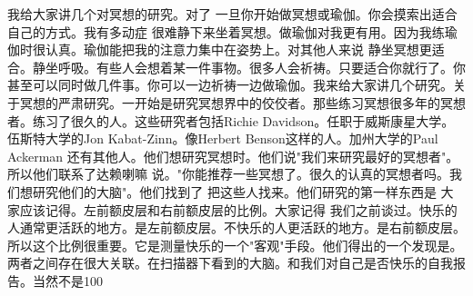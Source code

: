 我给大家讲几个对冥想的研究。对了 一旦你开始做冥想或瑜伽。你会摸索出适合自己的方式。我有多动症 很难静下来坐着冥想。做瑜伽对我更有用。因为我练瑜伽时很认真。瑜伽能把我的注意力集中在姿势上。对其他人来说 静坐冥想更适合。静坐呼吸。有些人会想着某一件事物。很多人会祈祷。只要适合你就行了。你甚至可以同时做几件事。你可以一边祈祷一边做瑜伽。我来给大家讲几个研究。关于冥想的严肃研究。一开始是研究冥想界中的佼佼者。那些练习冥想很多年的冥想者。练习了很久的人。这些研究者包括Richie Davidson。任职于威斯康星大学。伍斯特大学的Jon Kabat-Zinn。像Herbert Benson这样的人。加州大学的Paul Ackerman 还有其他人。他们想研究冥想时。他们说"我们来研究最好的冥想者"。所以他们联系了达赖喇嘛 说。"你能推荐一些冥想了。很久的认真的冥想者吗。我们想研究他们的大脑"。他们找到了 把这些人找来。他们研究的第一样东西是 大家应该记得。左前额皮层和右前额皮层的比例。大家记得 我们之前谈过。快乐的人通常更活跃的地方。是左前额皮层。不快乐的人更活跃的地方。是右前额皮层。所以这个比例很重要。它是测量快乐的一个"客观"手段。他们得出的一个发现是。两者之间存在很大关联。在扫描器下看到的大脑。和我们对自己是否快乐的自我报告。当然不是100%